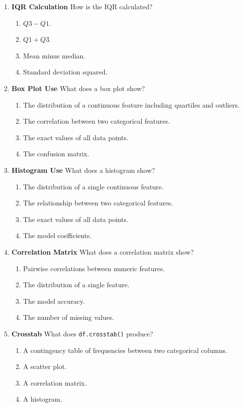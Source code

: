 \documentclass{article}
\begin{document}
\begin{enumerate}[label=\textbf{Q\arabic*.}]
		\item \textbf{IQR Calculation}
		How is the IQR calculated?
		\begin{enumerate}[label=\Alph*.]
			\item $Q3 - Q1$.
			\item $Q1 + Q3$.
			\item Mean minus median.
			\item Standard deviation squared.
		\end{enumerate}
		
		\item \textbf{Box Plot Use}
		What does a box plot show?
		\begin{enumerate}[label=\Alph*.]
			\item The distribution of a continuous feature including quartiles and outliers.
			\item The correlation between two categorical features.
			\item The exact values of all data points.
			\item The confusion matrix.
		\end{enumerate}
		
		\item \textbf{Histogram Use}
		What does a histogram show?
		\begin{enumerate}[label=\Alph*.]
			\item The distribution of a single continuous feature.
			\item The relationship between two categorical features.
			\item The exact values of all data points.
			\item The model coefficients.
		\end{enumerate}
		
		\item \textbf{Correlation Matrix}
		What does a correlation matrix show?
		\begin{enumerate}[label=\Alph*.]
			\item Pairwise correlations between numeric features.
			\item The distribution of a single feature.
			\item The model accuracy.
			\item The number of missing values.
		\end{enumerate}
		
		\item \textbf{Crosstab}
		What does \texttt{df.crosstab()} produce?
		\begin{enumerate}[label=\Alph*.]
			\item A contingency table of frequencies between two categorical columns.
			\item A scatter plot.
			\item A correlation matrix.
			\item A histogram.
		\end{enumerate}
		

\end{enumerate}
\end{document}
